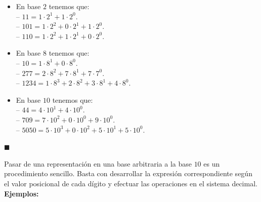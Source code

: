 \documentclass[10 pt]{article}
\begin{document}
\begin{itemize}
    \item \Large{En base $2$ tenemos que: \\

    -- $11=1 \cdot 2^1+1 \cdot 2^0$. \\

    -- $101=1 \cdot 2^2+0 \cdot 2^1+1 \cdot 2^0$. \\

    -- $110=1 \cdot 2^2+1 \cdot 2^1+0 \cdot 2^0$.} \\

    \item \Large{En base $8$ tenemos que: \\

    -- $10=1 \cdot 8^1+0 \cdot 8^0$. \\

    -- $277=2 \cdot 8^2+7 \cdot 8^1+7 \cdot 7^0$. \\ 

    -- $1234=1 \cdot 8^3+2 \cdot 8^2+3 \cdot 8^1+4 \cdot 8^0$.}\\

    \item \Large{En base $10$ tenemos que: \\

    -- $44=4 \cdot 10^1+4 \cdot 10^0$. \\

    -- $709=7 \cdot 10^2+0 \cdot 10^0+9 \cdot 10^0$. \\

    -- $5050=5 \cdot 10^3+0 \cdot 10^2+5 \cdot 10^1+5 \cdot 10^0$.}\\
\end{itemize}

\begin{flushright}
    $\blacksquare$
\end{flushright}

\Large{Pasar de una representación en una base arbitraria a la base $10$ es un procedimiento sencillo. Basta con desarrollar la expresión correspondiente según el valor posicional de cada dígito y efectuar las operaciones en el sistema decimal.} \\

\Large{\textbf{Ejemplos:}} \\
\end{document}
